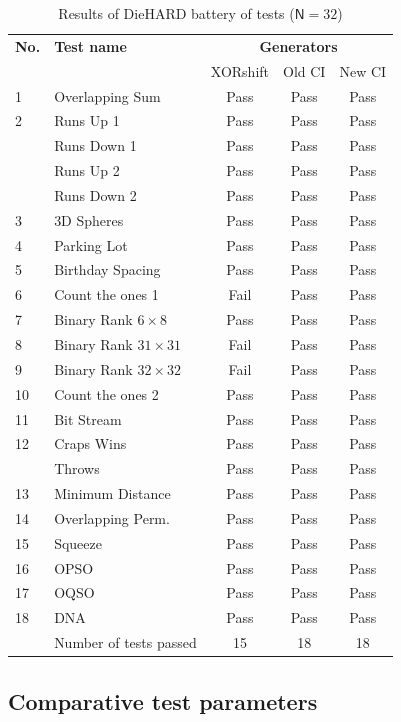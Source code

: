 \begin{tiny}
\begin{table}[!t]
\renewcommand{\arraystretch}{1.3}
\caption{Results of DieHARD battery of tests ($\mathsf{N}=32$)}
\label{Results of DieHARD battery of tests}
\centering
\begin{tabular}{llccc} \toprule
\textbf{No.} &\textbf{Test name} &\multicolumn{3}{c}{\textbf{Generators}} \\ \cmidrule(r){3-5}
& & XORshift &  Old CI & New CI\\ \midrule
1 & Overlapping Sum &Pass &Pass &Pass\\
2 & Runs Up 1 &Pass & Pass &Pass\\
&Runs Down 1 &Pass &Pass &Pass\\
&Runs Up 2 & Pass &Pass &Pass\\
&Runs Down 2 &Pass & Pass &Pass\\
3 & 3D Spheres &Pass &Pass &Pass\\
4 & Parking Lot &Pass &Pass &Pass\\
5 & Birthday Spacing &Pass &Pass &Pass\\
6 & Count the ones 1 &Fail &Pass &Pass\\
7 &Binary Rank $6 \times 8$ &Pass & Pass &Pass\\
8 &Binary Rank $31 \times 31$ &Fail &Pass &Pass\\
9 &Binary Rank $32 \times 32$ &Fail &Pass &Pass\\
10 &Count the ones 2 &Pass &Pass&Pass \\
11 &Bit Stream &Pass &Pass&Pass \\
12 &Craps Wins &Pass &Pass&Pass \\
&Throws &Pass &Pass &Pass\\
13 &Minimum Distance &Pass &Pass &Pass\\
14 &Overlapping Perm. &Pass &Pass &Pass\\
15 &Squeeze &Pass &Pass&Pass \\
16 &OPSO &Pass &Pass&Pass \\
17 &OQSO &Pass &Pass&Pass \\
18 &DNA &Pass &Pass&Pass \\
&Number of tests passed &15 &18 &18\\\bottomrule
\end{tabular}
\end{table}
\end{tiny}

\subsection{Comparative test parameters}

